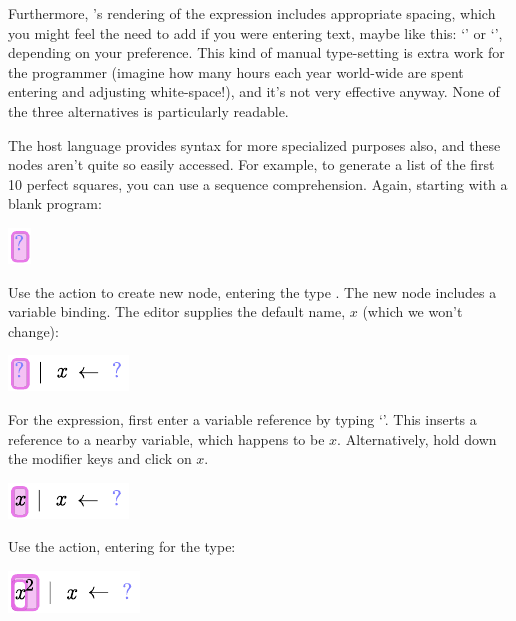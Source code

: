 Furthermore, \Meta's rendering of the expression includes appropriate spacing, which you might feel the need to add if you were entering text, maybe like this: `' or `', depending on your preference. This kind of manual type-setting is extra work for the programmer (imagine how many hours each year world-wide are spent entering and adjusting white-space!), and it's not very effective anyway. None of the three alternatives is particularly readable.

\vspace{12pt}

The host language provides syntax for more specialized purposes also, and these nodes aren't quite so easily accessed. For example, to generate a list of the first 10 perfect squares, you can use a sequence comprehension. Again, starting with a blank program:
\begin{center}
\includegraphics{src/image/for1.pdf}
\end{center}

Use the  action to create new node, entering the type . The new node includes a variable binding. The editor supplies the default name, $x$ (which we won't change):
\begin{center}
\includegraphics{src/image/for2.pdf}
\end{center}

For the expression, first enter a variable reference by typing `'. This inserts a reference to a nearby variable, which happens to be $x$. Alternatively, hold down the  modifier keys and click on $x$.
\begin{center}
\includegraphics{src/image/for3.pdf}
\end{center}

Use the  action, entering  for the type:
\begin{center}
\includegraphics{src/image/for4.pdf}
\end{center}


